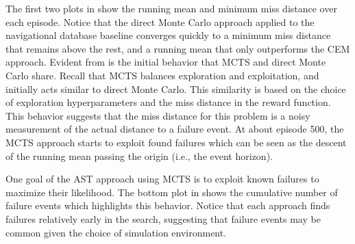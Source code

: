 The first two plots in  show the running mean and minimum miss distance over each episode.
Notice that the direct Monte Carlo approach applied to the navigational database baseline converges quickly to a minimum miss distance that remains above the rest, and a running mean that only outperforms the CEM approach.
Evident from  is the initial behavior that MCTS and direct Monte Carlo share.
Recall that MCTS balances exploration and exploitation, and initially acts similar to direct Monte Carlo.
This similarity is based on the choice of exploration hyperparameters and the miss distance in the reward function.
This behavior suggests that the miss distance for this problem is a noisy measurement of the actual distance to a failure event.
At about episode 500, the MCTS approach starts to exploit found failures which can be seen as the descent of the running mean passing the origin (i.e., the event horizon).


One goal of the AST approach using MCTS is to exploit known failures to maximize their likelihood.
The bottom plot in  shows the cumulative number of failure events which highlights this behavior.
Notice that each approach finds failures relatively early in the search, suggesting that failure events may be common given the choice of simulation environment.


